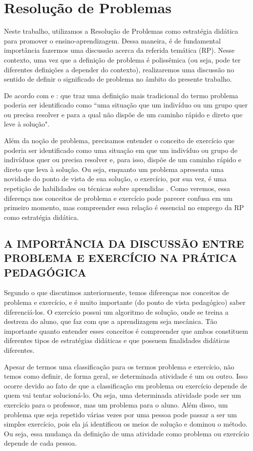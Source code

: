 \chapter{Resolução de Problemas}\label{ch:rp}

Neste trabalho, utilizamos a Resolução de Problemas como estratégia didática para promover o ensino-aprendizagem. Dessa maneira, é de fundamental importância fazermos uma discussão acerca da referida temática (RP). Nesse contexto, uma vez que a definição de problema é polissêmica (ou seja, pode ter diferentes definições a depender do contexto), realizaremos uma discussão no sentido de definir o significado de problema no âmbito do presente trabalho. 

De acordo com  e : que traz uma definição mais tradicional do termo problema poderia ser identificado como “uma situação que um indivíduo ou um grupo quer ou precisa resolver e para a qual não dispõe de um caminho rápido e direto que leve à solução". 

Além da noção de problema, precisamos entender o conceito de exercício que poderia ser identificado como uma situação em que um indivíduo ou grupo de indivíduos quer ou precisa resolver e, para isso, dispõe de um caminho rápido e direto que leva à solução. Ou seja, enquanto um problema apresenta uma novidade do ponto de vista de sua solução, o exercício, por sua vez, é uma repetição de habilidades ou técnicas sobre aprendidas \cite{Echeverria1998}. Como veremos, essa diferença nos conceitos de problema e exercício pode parecer confusa em um primeiro momento, mas compreender essa relação é essencial no emprego da RP como estratégia didática. 

\section{A IMPORTÂNCIA DA DISCUSSÃO ENTRE PROBLEMA E EXERCÍCIO NA PRÁTICA PEDAGÓGICA}

Segundo o que discutimos anteriormente, temos diferenças nos conceitos de problema e exercício, e é muito importante (do ponto de vista pedagógico) saber diferenciá-los. O exercício possui um algoritmo de solução, onde se treina a destreza do aluno, que faz com que a aprendizagem seja mecânica. Tão importante quanto entender esses conceitos é compreender que ambos constituem diferentes tipos de estratégias didáticas e que possuem finalidades didáticas diferentes. 

Apesar de termos uma classificação para os termos problema e exercício, não temos como definir, de forma geral, se determinada atividade é um ou outro. Isso ocorre devido ao fato de que a classificação em problema ou exercício depende de quem vai tentar solucioná-lo. Ou seja, uma determinada atividade pode ser um exercício para o professor, mas um problema para o aluno. Além disso, um problema que seja repetido várias vezes por uma pessoa pode passar a ser um simples exercício, pois ela já identificou os meios de solução e dominou o método. Ou seja, essa mudança da definição de uma atividade como problema ou exercício depende de cada pessoa. 

